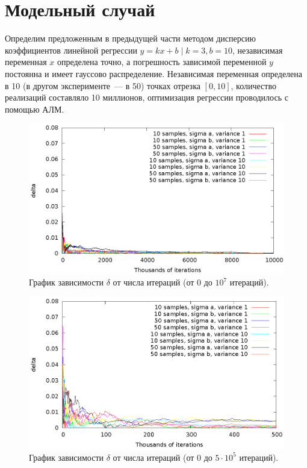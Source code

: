 \documentclass[11pt,a4paper]{article}
\theoremstyle{definition}
\begin{document}
\section{Модельный случай}

Определим предложенным в предыдущей части методом дисперсию коэффициентов
линейной регрессии $y = kx + b \mid k = 3, b = 10$, независимая
переменная $x$ определена точно, а погрешность зависимой переменной $y$
постоянна и имеет гауссово распределение. Независимая переменная
определена в 10 (в другом эксперименте~--- в 50) точках отрезка $[0, 10]$, количество реализаций
составляло 10 миллионов, оптимизация регрессии проводилось с помощью АЛМ.

\begin{figure}[h]
  \centering
  \includegraphics[scale=1.2]{figs/classic/variance_all_0_all.eps}
  \caption{График зависимости $\delta$ от числа итераций (от 0 до $10^7$ итераций).}
  \label{fig:classic_all_0_all}
\end{figure}

\begin{figure}[h]
  \centering
  \includegraphics[scale=1.2]{figs/classic/variance_all_0_500.eps}
  \caption{График зависимости $\delta$ от числа итераций (от 0 до $5 \cdot 10^5$ итераций).}
  \label{fig:classic_all_0_500}
\end{figure}
\end{document}
